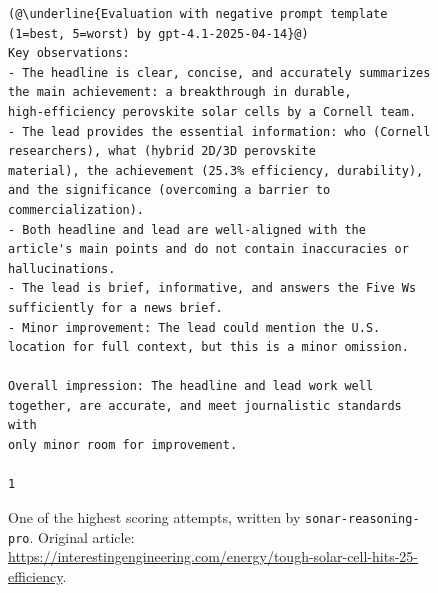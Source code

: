 \documentclass[UTF8,noindent,nohyp,parspace,titlepage,twoside,12pt]{article}
\begin{document}
\begin{figure}[!hbtp]
\begin{lstlisting}[basicstyle=\tiny\sffamily,frame=single,linewidth=\textwidth]
(@\underline{Evaluation with negative prompt template (1=best, 5=worst) by gpt-4.1-2025-04-14}@)
Key observations:
- The headline is clear, concise, and accurately summarizes the main achievement: a breakthrough in durable,
high-efficiency perovskite solar cells by a Cornell team.
- The lead provides the essential information: who (Cornell researchers), what (hybrid 2D/3D perovskite
material), the achievement (25.3% efficiency, durability), and the significance (overcoming a barrier to
commercialization).
- Both headline and lead are well-aligned with the article's main points and do not contain inaccuracies or
hallucinations.
- The lead is brief, informative, and answers the Five Ws sufficiently for a news brief.
- Minor improvement: The lead could mention the U.S. location for full context, but this is a minor omission.

Overall impression: The headline and lead work well together, are accurate, and meet journalistic standards with
only minor room for improvement.

1
      \end{lstlisting}
      \caption{%
        One of the highest scoring attempts, written by
        \texttt{sonar-reasoning-pro}. Original article:
        \url{https://interestingengineering.com/energy/tough-solar-cell-hits-25-efficiency}.
      }
    \end{figure}
\end{document}
